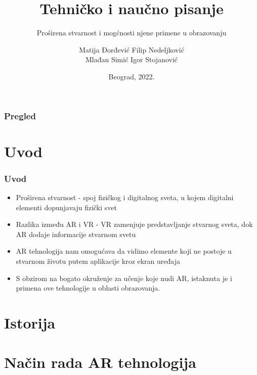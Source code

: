 \documentclass[9pt]{beamer}
\title{Tehničko i naučno pisanje}
\subtitle{Proširena stvarnost i mogćnosti njene primene u obrazovanju}
\author{Matija Đorđević  Filip Nedeljković\\
Mlađan Simić  Igor Stojanović}
\institute{Matematički fakultet\\Univerzitet u Beogradu}
\date{
	\footnotesize{Beograd, 2022.}	
}
\begin{document}
\begin{frame}
	\thispagestyle{empty}
	\titlepage
\end{frame}

\addtocounter{framenumber}{-1}







\begin{frame}
	\frametitle{Pregled} %
	\tableofcontents[hidesubsections] 
\end{frame}

\section{Uvod}

\begin{frame}[fragile]\frametitle{Uvod}
	\begin{itemize}	
 \setlength\itemsep{1.5em}
		\item Proširena stvarnost - spoj fizičkog i digitalnog sveta, u kojem digitalni elementi dopunjavaju fizički svet
		\item Razlika između AR i VR - VR zamenjuje predstavljanje stvarnog sveta, dok AR dodaje informacije stvarnom svetu
		\item AR tehnologija nam omogućava da vidimo elemente koji ne postoje u stvarnom životu putem aplikacije kroz ekran uređaja
		\item S obzirom na bogato okruženje za učenje koje nudi AR, istaknuta je i primena ove tehnologije u oblasti obrazovanja.
	
	\end{itemize}
\end{frame}





\section{Istorija}
	\begin{frame}

		
	\end{frame}
	
\section{Način rada AR tehnologija}
\end{document}
